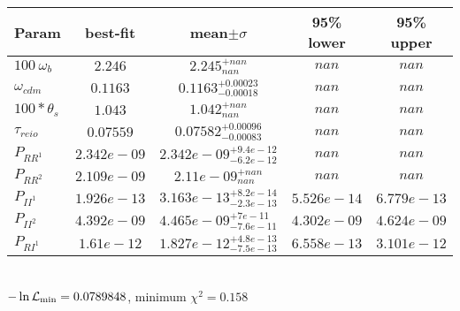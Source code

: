 \begin{tabular}{|l|c|c|c|c|} 
 \hline 
Param & best-fit & mean$\pm\sigma$ & 95\% lower & 95\% upper \\ \hline 
$100~\omega_{b }$ &$2.246$ & $2.245_{nan}^{+nan}$ & $nan$ & $nan$ \\ 
$\omega_{cdm }$ &$0.1163$ & $0.1163_{-0.00018}^{+0.00023}$ & $nan$ & $nan$ \\ 
$100*\theta_{s }$ &$1.043$ & $1.042_{nan}^{+nan}$ & $nan$ & $nan$ \\ 
$\tau_{reio }$ &$0.07559$ & $0.07582_{-0.00083}^{+0.00096}$ & $nan$ & $nan$ \\ 
$P_{{RR}^1 }$ &$2.342e-09$ & $2.342e-09_{-6.2e-12}^{+9.4e-12}$ & $nan$ & $nan$ \\ 
$P_{{RR}^2 }$ &$2.109e-09$ & $2.11e-09_{nan}^{+nan}$ & $nan$ & $nan$ \\ 
$P_{{II}^1 }$ &$1.926e-13$ & $3.163e-13_{-2.3e-13}^{+8.2e-14}$ & $5.526e-14$ & $6.779e-13$ \\ 
$P_{{II}^2 }$ &$4.392e-09$ & $4.465e-09_{-7.6e-11}^{+7e-11}$ & $4.302e-09$ & $4.624e-09$ \\ 
$P_{{RI}^1 }$ &$1.61e-12$ & $1.827e-12_{-7.5e-13}^{+4.8e-13}$ & $6.558e-13$ & $3.101e-12$ \\ 
\hline 
 \end{tabular} \\ 
$-\ln{\cal L}_\mathrm{min} =0.0789848$, minimum $\chi^2=0.158$ \\ 
